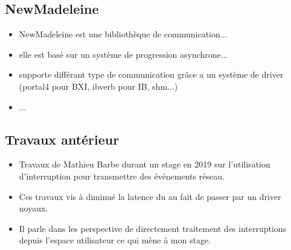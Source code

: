 \subsection{NewMadeleine}

\begin{itemize}
  \item NewMadeleine est une bibliothèque de communication...
  \item elle est basé sur un système de progression asynchrone...
  \item supporte différant type de communication grâce a un système de driver (portal4 pour BXI, ibverb pour IB, shm...)
  \item ...
\end{itemize}

\subsection{Travaux antérieur}

\begin{itemize}
  \item Travaux de Mathieu Barbe durant un stage en 2019 sur l'utilisation d'interruption pour transmettre des événements réseau.
  \item Ces travaux vis à diminué la latence du au fait de passer par un driver noyaux.
  \item Il parle dans les perspective de directement traitement des interruptions depuis l'espace utilisateur ce qui mène à mon stage.
\end{itemize}


